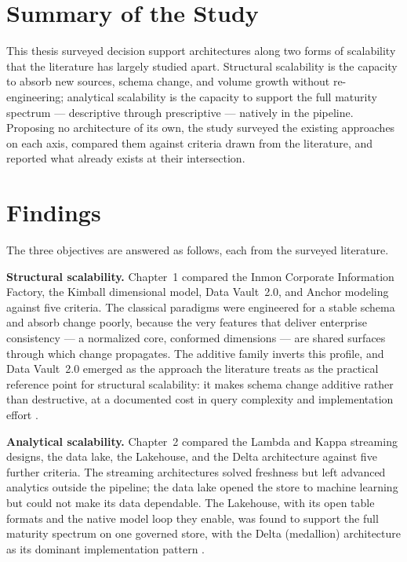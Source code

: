 
\section*{Summary of the Study}

This thesis surveyed decision support architectures along two forms of scalability that the literature has largely studied apart. Structural scalability is the capacity to absorb new sources, schema change, and volume growth without re-engineering; analytical scalability is the capacity to support the full maturity spectrum --- descriptive through prescriptive --- natively in the pipeline. Proposing no architecture of its own, the study surveyed the existing approaches on each axis, compared them against criteria drawn from the literature, and reported what already exists at their intersection.

\section*{Findings}

The three objectives are answered as follows, each from the surveyed literature.

\noindent\textbf{Structural scalability.} Chapter~1 compared the Inmon Corporate Information Factory, the Kimball dimensional model, Data Vault~2.0, and Anchor modeling against five criteria. The classical paradigms were engineered for a stable schema and absorb change poorly, because the very features that deliver enterprise consistency --- a normalized core, conformed dimensions --- are shared surfaces through which change propagates. The additive family inverts this profile, and Data Vault~2.0 emerged as the approach the literature treats as the practical reference point for structural scalability: it makes schema change additive rather than destructive, at a documented cost in query complexity and implementation effort \parencite{linstedt2015, inmon2005, kimball2013}.

\noindent\textbf{Analytical scalability.} Chapter~2 compared the Lambda and Kappa streaming designs, the data lake, the Lakehouse, and the Delta architecture against five further criteria. The streaming architectures solved freshness but left advanced analytics outside the pipeline; the data lake opened the store to machine learning but could not make its data dependable. The Lakehouse, with its open table formats and the native model loop they enable, was found to support the full maturity spectrum on one governed store, with the Delta (medallion) architecture as its dominant implementation pattern \parencite{armbrust2021, harby2024, schneider2024, databricks2022}.

